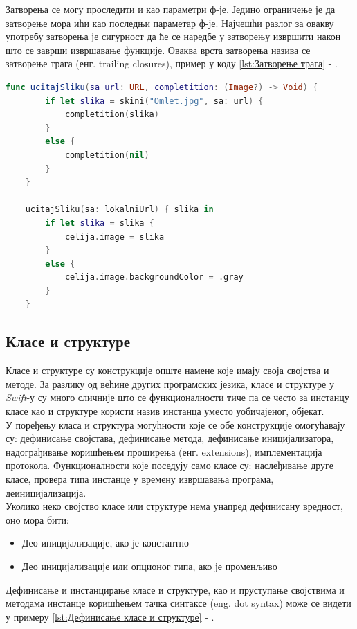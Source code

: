 \documentclass[12pt,oneside]{memoir}
\begin{document}
\indent Затворења се могу проследити и као параметри ф-је. Једино ограничење је да затворење мора ићи као последњи параметар ф-је. Најчешћи разлог за овакву употребу затворења је сигурност да ће се наредбе у затворењу извршити након што се заврши извршавање функције. Оваква врста затворења назива се затворење трага (енг. trailing closures), пример у коду \ref{lst:Затворење трага} - .

\begin{lstlisting}[caption=\textit{{Затворење трага}}, label={lst:Затворење трага}, language=Swift, frame=single]
    func ucitajSliku(sa url: URL, completition: (Image?) -> Void) {
        if let slika = skini("Omlet.jpg", sa: url) {
            completition(slika)
        }
        else {
            completition(nil)
        }
    }
    
    ucitajSliku(sa: lokalniUrl) { slika in
        if let slika = slika {
            celija.image = slika
        }
        else {
            celija.image.backgroundColor = .gray
        }
    }
\end{lstlisting}

\subsection{Класе и структуре}

\indent Класе и структуре су конструкције опште намене које имају своја својства и методе. За разлику од већине других програмских језика, класе и структуре у \textit{Swift}-у су много сличније што се функционалности тиче па се често за инстанцу класе као и структуре користи назив инстанца уместо уобичајеног, објекат. 
\\
\indent У поређењу класа и структура могућности које се обе конструкције омогућавају су: дефинисање својстава, дефинисање метода, дефинисање иницијализатора, надограђивање коришћењем проширења (енг. extensions), имплементација протокола. Функционалности које поседују само класе су: наслеђивање друге класе, провера типа инстанце у времену извршавања програма, деиницијализација.
\\
\indent Уколико неко својство класе или структуре нема унапред дефинисану вредност, оно мора бити: 
\begin{itemize}
    \item Део иницијализације, ако је константно 
    \item Део иницијализације или опционог типа, ако је променљиво 
\end{itemize}
Дефинисање и инстанцирање класе и структуре, као и пруступање својствима и методама инстанце коришћењем тачка синтаксе (eng. dot syntax) може се видети у примеру \ref{lst:Дефинисање класе и структуре} - .
\end{document}
